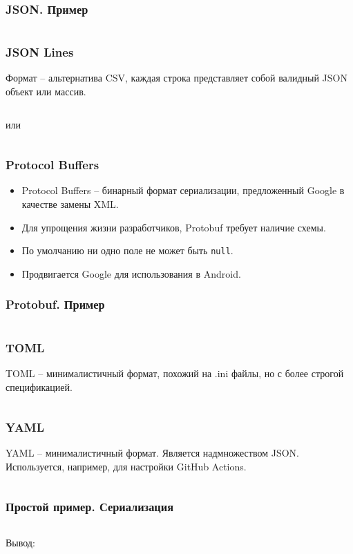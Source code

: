 \documentclass[aspectratio=169]{beamer}
\begin{document}
\begin{frame}[fragile]
    \frametitle{JSON. Пример}
    \inputminted[]{json}{serialization_examples/example.json}
\end{frame}

\begin{frame}[fragile]
    \frametitle{JSON Lines}
    Формат -- альтернатива CSV, каждая строка представляет собой валидный JSON объект или массив.
    \inputminted[]{json}{serialization_examples/example1.jsonl}
    или
    \inputminted[]{json}{serialization_examples/example2.jsonl}
\end{frame}

\begin{frame}
    \frametitle{Protocol Buffers}

    \begin{itemize}
        \item Protocol Buffers  -- бинарный формат сериализации, предложенный Google в качестве замены XML.
        \item Для упрощения жизни разработчиков, Protobuf требует наличие схемы.
        \item По умолчанию ни одно поле не может быть \texttt{null}.
        \item Продвигается Google для использования в Android.
    \end{itemize}
\end{frame}
\begin{frame}
    \frametitle{Protobuf. Пример}
    \inputminted[]{protobuf}{serialization_examples/example.proto}
\end{frame}

\begin{frame}
    \frametitle{TOML}
    TOML -- минималистичный формат, похожий на .ini файлы, но с более строгой спецификацией.
    \inputminted[]{toml}{serialization_examples/example.toml}
\end{frame}

\begin{frame}
    \frametitle{YAML}
    YAML -- минималистичный формат. Является надмножеством JSON.
    Используется, например, для настройки GitHub Actions.
    \inputminted[]{yaml}{serialization_examples/example.yaml}
\end{frame}

\begin{frame}[fragile]
    \frametitle{Простой пример. Сериализация}
    \inputminted[]{kotlin}{serialization_examples/serialization1.kt}
    Вывод:
    \inputminted[]{json}{serialization_examples/serialization1.json}
\end{frame}
\end{document}
